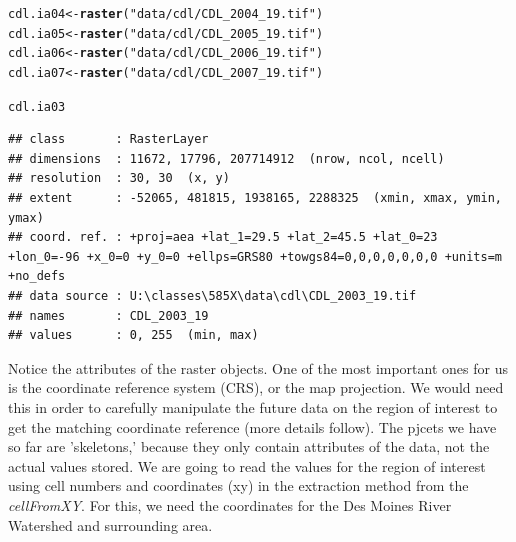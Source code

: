 \documentclass{article}\usepackage[]{graphicx}\usepackage[]{color}
\makeatletter
\newcommand{\hlstr}[1]{\textcolor[rgb]{0.192,0.494,0.8}{#1}}%
\newcommand{\hlstd}[1]{\textcolor[rgb]{0.345,0.345,0.345}{#1}}%
\newcommand{\hlkwb}[1]{\textcolor[rgb]{0.69,0.353,0.396}{#1}}%
\newcommand{\hlkwd}[1]{\textcolor[rgb]{0.737,0.353,0.396}{\textbf{#1}}}%
\newenvironment{kframe}{%
 \def\at@end@of@kframe{}%
 \ifinner\ifhmode%
  \def\at@end@of@kframe{\end{minipage}}%
  \begin{minipage}{\columnwidth}%
 \fi\fi%
 \def\FrameCommand##1{\hskip\@totalleftmargin \hskip-\fboxsep
 \colorbox{shadecolor}{##1}\hskip-\fboxsep
     \hskip-\linewidth \hskip-\@totalleftmargin \hskip\columnwidth}%
 \MakeFramed {\advance\hsize-\width
   \@totalleftmargin\z@ \linewidth\hsize
   \@setminipage}}%
 {\par\unskip\endMakeFramed%
 \at@end@of@kframe}
\newenvironment{knitrout}{}{} %
\makeatother
\begin{document}
\begin{itemize}
\begin{knitrout}
\begin{kframe}
{\ttfamily\noindent\itshape\color{messagecolor}{\#\# rgdal: version: 0.8-14, (SVN revision 496)\\\#\# Geospatial Data Abstraction Library extensions to R successfully loaded\\\#\# Loaded GDAL runtime: GDAL 1.10.1, released 2013/08/26\\\#\# Path to GDAL shared files: C:/Program Files/R/R-3.0.2/library/rgdal/gdal\\\#\# GDAL does not use iconv for recoding strings.\\\#\# Loaded PROJ.4 runtime: Rel. 4.8.0, 6 March 2012, [PJ\_VERSION: 480]\\\#\# Path to PROJ.4 shared files: C:/Program Files/R/R-3.0.2/library/rgdal/proj}}\begin{alltt}
\hlstd{cdl.ia04} \hlkwb{<-} \hlkwd{raster}\hlstd{(}\hlstr{"data/cdl/CDL_2004_19.tif"}\hlstd{)}
\hlstd{cdl.ia05} \hlkwb{<-} \hlkwd{raster}\hlstd{(}\hlstr{"data/cdl/CDL_2005_19.tif"}\hlstd{)}
\hlstd{cdl.ia06} \hlkwb{<-} \hlkwd{raster}\hlstd{(}\hlstr{"data/cdl/CDL_2006_19.tif"}\hlstd{)}
\hlstd{cdl.ia07} \hlkwb{<-} \hlkwd{raster}\hlstd{(}\hlstr{"data/cdl/CDL_2007_19.tif"}\hlstd{)}

\hlstd{cdl.ia03}
\end{alltt}
\begin{verbatim}
## class       : RasterLayer 
## dimensions  : 11672, 17796, 207714912  (nrow, ncol, ncell)
## resolution  : 30, 30  (x, y)
## extent      : -52065, 481815, 1938165, 2288325  (xmin, xmax, ymin, ymax)
## coord. ref. : +proj=aea +lat_1=29.5 +lat_2=45.5 +lat_0=23 +lon_0=-96 +x_0=0 +y_0=0 +ellps=GRS80 +towgs84=0,0,0,0,0,0,0 +units=m +no_defs 
## data source : U:\classes\585X\data\cdl\CDL_2003_19.tif 
## names       : CDL_2003_19 
## values      : 0, 255  (min, max)
\end{verbatim}
\end{kframe}
\end{knitrout}



Notice the attributes of the raster objects. One of the most important ones for us is the coordinate reference system (CRS), or the map projection. We would need this in order to carefully manipulate the future data on the region of interest to get the matching coordinate reference (more details follow). The pjcets we have so far are 'skeletons,' because they only contain attributes of the data, not the actual values stored. We are going to read the values for the region of interest using cell numbers and coordinates (xy) in the extraction method from the \textit{cellFromXY}. For this, we need the coordinates for the Des Moines River Watershed and surrounding area. 


\end{itemize}
\end{document}
